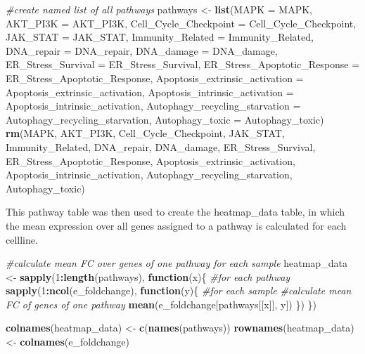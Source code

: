 \documentclass[]{article}
\newenvironment{Shaded}{\begin{snugshade}}{\end{snugshade}}
\newcommand{\CommentTok}[1]{\textcolor[rgb]{0.56,0.35,0.01}{\textit{#1}}}
\newcommand{\ControlFlowTok}[1]{\textcolor[rgb]{0.13,0.29,0.53}{\textbf{#1}}}
\newcommand{\DataTypeTok}[1]{\textcolor[rgb]{0.13,0.29,0.53}{#1}}
\newcommand{\DecValTok}[1]{\textcolor[rgb]{0.00,0.00,0.81}{#1}}
\newcommand{\KeywordTok}[1]{\textcolor[rgb]{0.13,0.29,0.53}{\textbf{#1}}}
\newcommand{\NormalTok}[1]{#1}
\newcommand{\OperatorTok}[1]{\textcolor[rgb]{0.81,0.36,0.00}{\textbf{#1}}}
\newcommand{\StringTok}[1]{\textcolor[rgb]{0.31,0.60,0.02}{#1}}
\begin{document}
\begin{Shaded}
\begin{Highlighting}[]
\CommentTok{#create named list of all pathways}
\NormalTok{pathways <-}\StringTok{ }\KeywordTok{list}\NormalTok{(}\DataTypeTok{MAPK =}\NormalTok{ MAPK, }
                 \DataTypeTok{AKT_PI3K =}\NormalTok{ AKT_PI3K, }
                 \DataTypeTok{Cell_Cycle_Checkpoint =}\NormalTok{ Cell_Cycle_Checkpoint, }
                 \DataTypeTok{JAK_STAT =}\NormalTok{ JAK_STAT,}
                 \DataTypeTok{Immunity_Related =}\NormalTok{ Immunity_Related,}
                 \DataTypeTok{DNA_repair =}\NormalTok{ DNA_repair,}
                 \DataTypeTok{DNA_damage =}\NormalTok{ DNA_damage,}
                 \DataTypeTok{ER_Stress_Survival =}\NormalTok{ ER_Stress_Survival,}
                 \DataTypeTok{ER_Stress_Apoptotic_Response =}\NormalTok{ ER_Stress_Apoptotic_Response,}
                 \DataTypeTok{Apoptosis_extrinsic_activation =}\NormalTok{ Apoptosis_extrinsic_activation, }
                 \DataTypeTok{Apoptosis_intrinsic_activation =}\NormalTok{ Apoptosis_intrinsic_activation, }
                 \DataTypeTok{Autophagy_recycling_starvation =}\NormalTok{ Autophagy_recycling_starvation,}
                 \DataTypeTok{Autophagy_toxic =}\NormalTok{ Autophagy_toxic) }
\KeywordTok{rm}\NormalTok{(MAPK, AKT_PI3K, Cell_Cycle_Checkpoint, JAK_STAT, Immunity_Related, DNA_repair, }
\NormalTok{   DNA_damage, ER_Stress_Survival, ER_Stress_Apoptotic_Response, }
\NormalTok{   Apoptosis_extrinsic_activation, Apoptosis_intrinsic_activation, }
\NormalTok{   Autophagy_recycling_starvation, Autophagy_toxic)}
\end{Highlighting}
\end{Shaded}

This pathway table was then used to create the heatmap\_data table, in
which the mean expression over all genes assigned to a pathway is
calculated for each cellline.

\begin{Shaded}
\begin{Highlighting}[]
\CommentTok{#calculate mean FC over genes of one pathway for each sample}
\NormalTok{heatmap_data <-}\StringTok{ }\KeywordTok{sapply}\NormalTok{(}\DecValTok{1}\OperatorTok{:}\KeywordTok{length}\NormalTok{(pathways), }\ControlFlowTok{function}\NormalTok{(x)\{ }\CommentTok{#for each pathway}
  \KeywordTok{sapply}\NormalTok{(}\DecValTok{1}\OperatorTok{:}\KeywordTok{ncol}\NormalTok{(e_foldchange), }\ControlFlowTok{function}\NormalTok{(y)\{ }\CommentTok{#for each sample}
    \CommentTok{#calculate mean FC of genes of one pathway}
    \KeywordTok{mean}\NormalTok{(e_foldchange[pathways[[x]], y]) }
\NormalTok{  \})}
\NormalTok{\})}

\KeywordTok{colnames}\NormalTok{(heatmap_data) <-}\StringTok{ }\KeywordTok{c}\NormalTok{(}\KeywordTok{names}\NormalTok{(pathways))}
\KeywordTok{rownames}\NormalTok{(heatmap_data) <-}\StringTok{ }\KeywordTok{colnames}\NormalTok{(e_foldchange)}
\end{Highlighting}
\end{Shaded}
\end{document}
